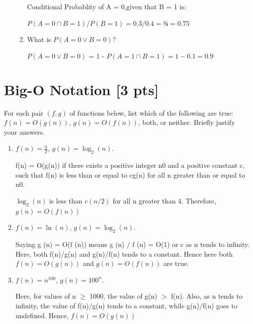 \documentclass[a4paper]{article}
\theoremstyle{definition}
\newenvironment{soln}{
    \leavevmode\color{blue}\ignorespaces
}{}
\begin{document}
\begin{enumerate}
\begin{enumerate}
\begin{soln}
			Conditional Probablity of A = 0,given that B = 1 is: 
		
			$P(A = 0  \cap  B = 1)/P(B = 1) = 0.3/0.4 = ¾ = 0.75$
	   
	    \end{soln}

	\item 	What is $P(A = 0 \vee B = 0 )$?\\
	    \begin{soln}  

			$P(A = 0 \vee B = 0 )$ = 1 - $P(A = 1 \cap  B = 1 ) = 1 - 0.1 = 0.9$

	   \end{soln}

\end{enumerate}
\end{enumerate}


\section{Big-O Notation [3 pts]}
For each pair $(f, g)$ of functions below, list which of the following
are true: $f(n) = O(g(n))$, $g(n) = O(f(n))$, both, or
neither. Briefly justify your answers.
\begin{enumerate}
	\item 	$f(n) = \frac{n}{2}$, $g(n) = \log_{2}(n)$.\\
	    \begin{soln}  
	                f(n) = O(g(n)) if there exists a positive integer n0 and a positive constant c, such that 
			f(n) is less than or equal to cg(n) for all n greater than or equal to n0.

			$\log_{2}(n)$ is less than $c(n/2)$ for all n greater than 4. Therefore, $g(n) = O(f(n))$ 
 
	   \end{soln}

	\item 	$f(n) = \ln(n)$, $g(n) = \log_{2}(n)$.\\
	    \begin{soln} 
		
			Saying g (n) = O(f (n)) means g (n) / f (n) = O(1) or c as n tends to infinity. 
			Here, both f(n)/g(n) and g(n)/f(n) tends to a constant. Hence here both $f(n) = O(g(n))$ and $g(n) = O(f(n))$ are true.  			 

	  \end{soln}
	
	\item 	$f(n) = n^{100}$, $g(n) = 100^n$.\\
	    \begin{soln}  
			
		Here, for values of n $\geq$ 1000, the value of g(n) $>$ f(n). Also, as n tends to infinity, the value of f(n)/g(n) tends to a constant, while g(n)/f(n) goes to undefined. 	
 		Hence, $f(n) = O(g(n))$
	\end{soln}

\end{enumerate}
\end{document}
